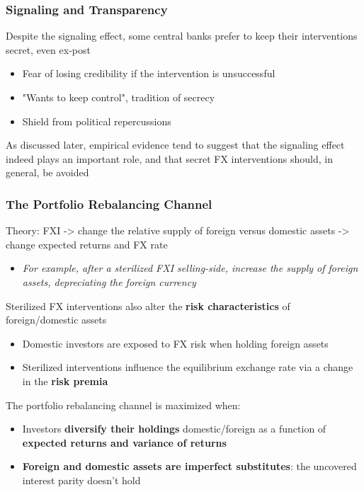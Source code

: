 \documentclass{beamer}
\newenvironment{wideitemize}{\itemize\addtolength{\itemsep}{10pt}}{\enditemize}
\begin{document}
\begin{frame}
  \frametitle{Signaling and Transparency}
  \begin{wideitemize}
  \item Despite the signaling effect, some central banks prefer to keep their interventions secret, even ex-post
    \begin{itemize}
    \item Fear of losing credibility if the intervention is unsuccessful
    \item "Wants to keep control", tradition of secrecy
    \item Shield from political repercussions
    \end{itemize}
  \item As discussed later, empirical evidence tend to suggest that the signaling effect indeed plays an important role, and that secret FX interventions should, in general, be avoided
    \end{wideitemize}
\end{frame}

   
\begin{frame}
  \frametitle{The Portfolio Rebalancing Channel}
  \begin{wideitemize}
  \item Theory: FXI -> change the relative supply of foreign versus domestic assets -> change expected returns and FX rate
    \begin{itemize}
    \item \emph{For example, after a sterilized FXI selling-side, increase the supply of foreign assets, depreciating the foreign currency}
    \end{itemize}

  \item Sterilized FX interventions also alter the \textbf{risk characteristics} of foreign/domestic assets
    \begin{itemize}
    \item Domestic investors are exposed to FX risk when holding foreign assets
    \item Sterilized interventions influence the equilibrium exchange rate via a change in the \textbf{risk premia}
    \end{itemize}

  \item The portfolio rebalancing channel is maximized when:\\
    
  \begin{itemize}    
  \item Investors \textbf{diversify their holdings} domestic/foreign as a function of \textbf{expected returns and variance of returns}
  \item \textbf{Foreign and domestic assets are imperfect substitutes}: the uncovered interest parity doesn't hold   
  \end{itemize}    
  \end{wideitemize}
\end{frame}
\end{document}
